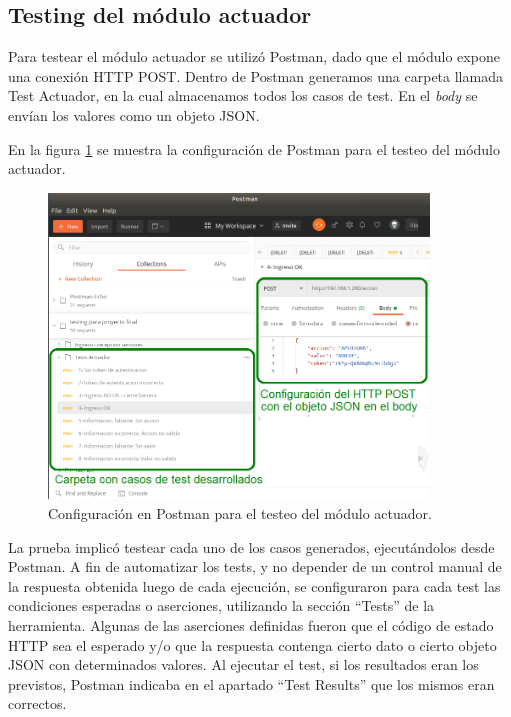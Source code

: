 \clearpage
\subsection{Testing del módulo actuador}

Para testear el módulo actuador se utilizó Postman, dado que el módulo expone una conexión HTTP POST. Dentro de Postman generamos una carpeta llamada Test Actuador, en la cual almacenamos todos los casos de test. En el \textit{body} se envían los valores como un objeto JSON.

En la figura \ref{fig:TestActuadorConfig} se muestra la configuración de Postman para el testeo del módulo actuador.

\begin{figure}[ht]
	\centering
	\includegraphics[width=0.9\textwidth]{./Figures/TestActuadorConfig.png}
	\caption{Configuración en Postman para el testeo del módulo actuador.}
	\label{fig:TestActuadorConfig}
\end{figure}

La prueba implicó testear cada uno de los casos generados, ejecutándolos desde Postman. A fin de automatizar los tests, y no depender de un control manual de la respuesta obtenida luego de cada ejecución, se configuraron para cada test las condiciones esperadas o aserciones, utilizando la sección ``Tests'' de la herramienta. Algunas de las aserciones definidas fueron que el código de estado HTTP sea el esperado y/o que la respuesta contenga cierto dato o cierto objeto JSON con determinados valores. Al ejecutar el test, si los resultados eran los previstos, Postman indicaba en el apartado ``Test Results'' que los mismos eran correctos.

